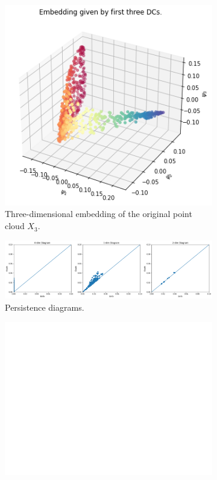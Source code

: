 \begin{figure}[H]
\centering
\begin{subfigure}[b]{0.2\textwidth}
    \includegraphics[width=\textwidth]{figures/topology/X3_embedding.png}
    \caption{Three-dimensional embedding of the original point cloud $X_3$.}
\end{subfigure}
\hfill
\begin{subfigure}[b]{0.75\textwidth}
    \includegraphics[width=\textwidth]{figures/topology/X3_H0.png}
    \caption{Persistence diagrams.}
\end{subfigure}
\begin{subfigure}[b]{0.25\textwidth}
\includegraphics[width=\textwidth]{figures/topology/white.png} 

\end{subfigure}
\end{figure}
